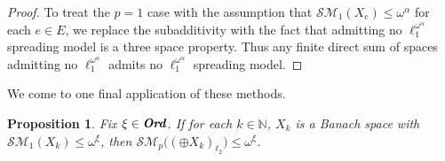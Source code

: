\documentclass[12pt]{amsart}
\newtheorem{proposition}[theorem]{Proposition}
\theoremstyle{definition}
\newcommand{\ord}{\textbf{Ord}}
\newcommand{\nn}{\mathbb{N}}
\newcommand{\ssm}{\mathcal{SM}}
\begin{document}
\begin{proof}
To treat the $p=1$ case with the assumption that $\ssm_1(X_e)\leqslant \omega^\alpha$ for each $e\in E$, we replace the subadditivity with the fact that admitting no $\ell_1^{\omega^\alpha}$ spreading model is a three space property.  Thus any finite direct sum of spaces admitting no $\ell_1^{\omega^\alpha}$ admits no $\ell_1^{\omega^\alpha}$ spreading model.  


\end{proof}





We come to one final application of these methods.  

\begin{proposition} Fix $\xi\in \emph{\ord}$.  If for each $k\in \nn$, $X_k$ is a Banach space with $\ssm_1(X_k)\leqslant \omega^\xi$, then $\ssm_p\bigl((\oplus X_k)_{\ell_2}\bigr)\leqslant\omega^\xi$.  

\end{proposition}
\end{document}
